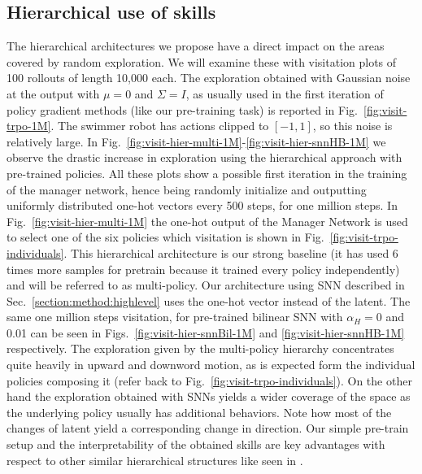 \documentclass{article} %
\begin{document}

\subsection{Hierarchical use of skills}

The hierarchical architectures we propose have a direct impact on the areas covered by random exploration. We will examine these with visitation plots of 100 rollouts of length 10,000 each. The exploration obtained with Gaussian noise at the output with $\mu=0$ and $\Sigma=I$, as usually used in the first iteration of policy gradient methods (like our pre-training task) is reported in Fig.\ \ref{fig:visit-trpo-1M}. The swimmer robot has actions clipped to $[-1,1]$, so this noise is relatively large. In Fig.\ \ref{fig:visit-hier-multi-1M}-\ref{fig:visit-hier-snnHB-1M} we observe the drastic increase in exploration using the hierarchical approach with pre-trained policies. All these plots show a possible first iteration in the training of the manager network, hence being randomly initialize and outputting uniformly distributed one-hot vectors every 500 steps, for one million steps. In Fig.\ \ref{fig:visit-hier-multi-1M} the one-hot output of the Manager Network is used to select one of the six policies which visitation is shown in Fig.\ \ref{fig:visit-trpo-individuals}. This hierarchical architecture is our strong baseline (it has used 6 times more samples for pretrain because it trained every policy independently) and will be referred to as multi-policy. Our architecture using SNN described in Sec.\ \ref{section:method:highlevel} uses the one-hot vector instead of the latent. The same one million steps visitation, for pre-trained bilinear SNN with $\alpha_H= 0$ and 0.01 can be seen in Figs.\ \ref{fig:visit-hier-snnBil-1M} and \ref{fig:visit-hier-snnHB-1M} respectively. The exploration given by the multi-policy hierarchy concentrates quite heavily in upward and downword motion, as is expected form the individual policies composing it (refer back to Fig.\ \ref{fig:visit-trpo-individuals}). On the other hand the exploration obtained with SNNs yields a wider coverage of the space as the underlying policy usually has additional behaviors. Note how most of the changes of latent yield a corresponding change in direction. Our simple pre-train setup and the interpretability of the obtained skills are key advantages with respect to other similar hierarchical structures like seen in \citet{heess2016learning}.
\end{document}
